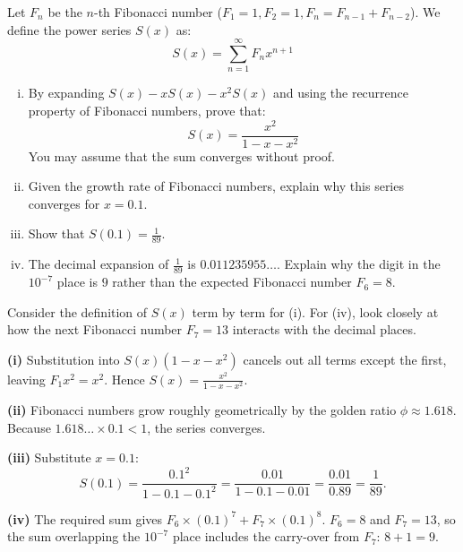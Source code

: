 \begin{problem}
Let $F_n$ be the $n$-th Fibonacci number ($F_1=1, F_2=1, F_n = F_{n-1} + F_{n-2}$). We define the power series $S(x)$ as:
\[
S(x) = \sum_{n=1}^\infty F_n x^{n+1}
\]

\begin{enumerate}[(i)]
    \item By expanding $S(x) - xS(x) - x^2S(x)$ and using the recurrence property of Fibonacci numbers, prove that:
    \[
    S(x) = \frac{x^2}{1 - x - x^2}
    \]
    You may assume that the sum converges without proof.
    \item Given the growth rate of Fibonacci numbers, explain why this series converges for $x = 0.1$.
    \item Show that $S(0.1) = \frac{1}{89}$.
    \item The decimal expansion of $\frac{1}{89}$ is $0.011235955\dots$. Explain why the digit in the $10^{-7}$ place is $9$ rather than the expected Fibonacci number $F_6 = 8$.
\end{enumerate}
\end{problem}
\begin{hint}
Consider the definition of $S(x)$ term by term for (i). For (iv), look closely at how the next Fibonacci number $F_7=13$ interacts with the decimal places.
\end{hint}
\begin{solution}
\textbf{(i)} Substitution into $S(x)(1-x-x^2)$ cancels out all terms except the first, leaving $F_1 x^2 = x^2$. Hence $S(x) = \frac{x^2}{1-x-x^2}$.

\textbf{(ii)} Fibonacci numbers grow roughly geometrically by the golden ratio $\phi \approx 1.618$. Because $1.618 \dots \times 0.1 < 1$, the series converges.

\textbf{(iii)} Substitute $x=0.1$:
\[
S(0.1) = \frac{0.1^2}{1 - 0.1 - 0.1^2} = \frac{0.01}{1 - 0.1 - 0.01} = \frac{0.01}{0.89} = \frac{1}{89}.
\]

\textbf{(iv)} The required sum gives $F_6 \times (0.1)^7 + F_7 \times (0.1)^8$. $F_6 = 8$ and $F_7 = 13$, so the sum overlapping the $10^{-7}$ place includes the carry-over from $F_7$: $8 + 1 = 9$.
\end{solution}



